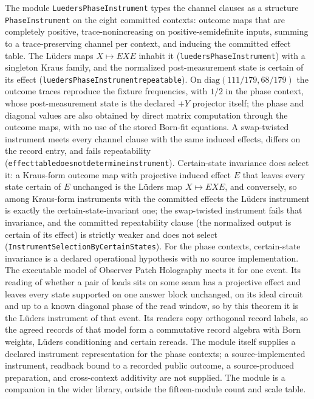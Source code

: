 \documentclass[11pt]{article}
\renewcommand{\_}{\textunderscore\allowbreak}
\theoremstyle{remark}
\begin{document}
The module \texttt{LuedersPhaseInstrument} types the channel clauses as a
structure \texttt{PhaseInstrument} on the eight committed contexts: outcome maps
that are completely positive, trace-nonincreasing on positive-semidefinite
inputs, summing to a trace-preserving channel per context, and inducing the
committed effect table. The L\"uders maps $X \mapsto EXE$ inhabit it
(\texttt{luedersPhaseInstrument}) with a singleton Kraus family, and the
normalized post-measurement state is certain of its effect
(\texttt{luedersPhaseInstrument\_repeatable}). On $\mathrm{diag}(111/179, 68/179)$
the outcome traces reproduce the fixture frequencies, with $1/2$ in the phase
context, whose post-measurement state is the declared $+Y$ projector itself;
the phase and diagonal values are also obtained by direct matrix computation
through the outcome maps, with no use of the stored Born-fit equations. A
swap-twisted instrument meets every channel clause with the same induced effects,
differs on the record entry, and fails repeatability
(\texttt{effect\_table\_does\_not\_determine\_instrument}). Certain-state
invariance does select it: a Kraus-form outcome map with projective induced
effect $E$ that leaves every state certain of $E$ unchanged is the L\"uders
map $X \mapsto EXE$, and conversely, so among Kraus-form instruments with the
committed effects the L\"uders instrument is exactly the certain-state-invariant
one; the swap-twisted instrument fails that invariance, and the committed
repeatability clause (the normalized output is certain of its effect) is
strictly weaker and does not select
(\texttt{InstrumentSelectionByCertainStates}). For the phase contexts,
certain-state invariance is a declared operational hypothesis with no source
implementation. The executable model of Observer Patch Holography meets it
for one event. Its reading of whether a pair of loads sits on some seam has
a projective effect and leaves every state supported on one answer block
unchanged, on its ideal circuit and up to a known diagonal phase of the read
window, so by this theorem it is the L\"uders instrument of that event. Its
readers copy orthogonal record labels, so the agreed records of that model
form a commutative record algebra with Born weights, L\"uders conditioning
and certain rereads. The module itself
supplies a declared instrument representation for the phase contexts; a source-implemented
instrument, readback bound to a recorded public outcome, a source-produced
preparation, and cross-context additivity are not supplied. The module is a
companion in the wider library, outside the fifteen-module count and scale
table.
\end{document}
